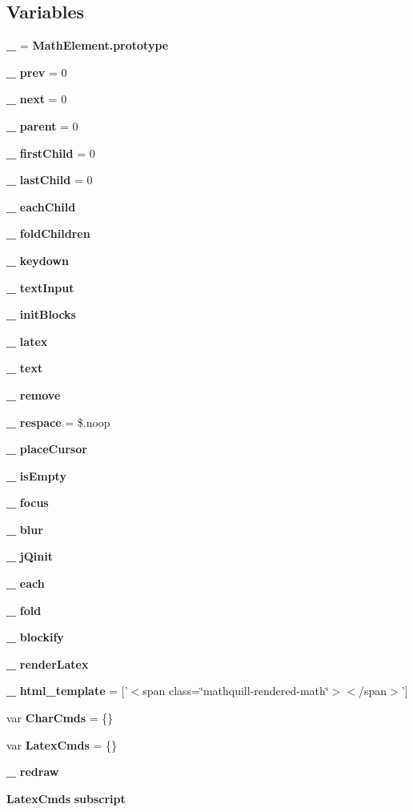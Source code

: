 \subsection*{Variables}
\begin{DoxyCompactItemize}
\item 
{\bf \-\_\-} = {\bf Math\-Element.\-prototype}
\item 
{\bf \-\_\-} {\bf prev} = 0
\item 
{\bf \-\_\-} {\bf next} = 0
\item 
{\bf \-\_\-} {\bf parent} = 0
\item 
{\bf \-\_\-} {\bf first\-Child} = 0
\item 
{\bf \-\_\-} {\bf last\-Child} = 0
\item 
{\bf \-\_\-} {\bf each\-Child}
\item 
{\bf \-\_\-} {\bf fold\-Children}
\item 
{\bf \-\_\-} {\bf keydown}
\item 
{\bf \-\_\-} {\bf text\-Input}
\item 
{\bf \-\_\-} {\bf init\-Blocks}
\item 
{\bf \-\_\-} {\bf latex}
\item 
{\bf \-\_\-} {\bf text}
\item 
{\bf \-\_\-} {\bf remove}
\item 
{\bf \-\_\-} {\bf respace} = \$.noop
\item 
{\bf \-\_\-} {\bf place\-Cursor}
\item 
{\bf \-\_\-} {\bf is\-Empty}
\item 
{\bf \-\_\-} {\bf focus}
\item 
{\bf \-\_\-} {\bf blur}
\item 
{\bf \-\_\-} {\bf j\-Qinit}
\item 
{\bf \-\_\-} {\bf each}
\item 
{\bf \-\_\-} {\bf fold}
\item 
{\bf \-\_\-} {\bf blockify}
\item 
{\bf \-\_\-} {\bf render\-Latex}
\item 
{\bf \-\_\-} {\bf html\-\_\-template} = ['$<$span class=\char`\"{}mathquill-\/rendered-\/math\char`\"{}$>$$<$/span$>$']
\item 
var {\bf Char\-Cmds} = \{\}
\item 
var {\bf Latex\-Cmds} = \{\}
\item 
{\bf \-\_\-} {\bf redraw}
\item 
{\bf Latex\-Cmds} {\bf subscript}
\item 
$$
\end{DoxyCompactItemize}
